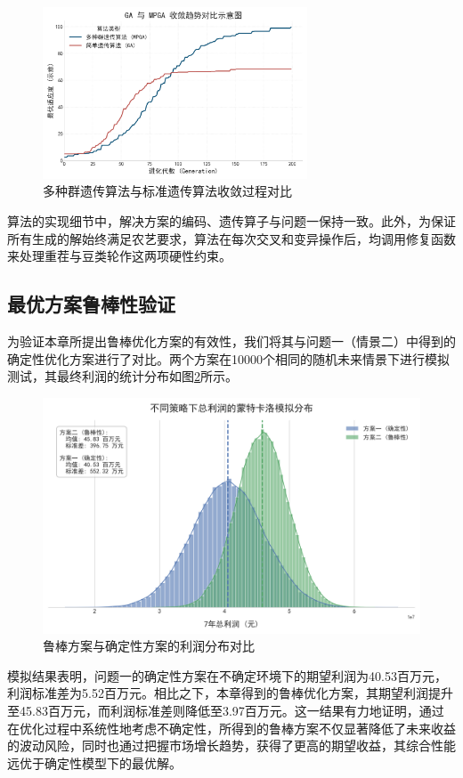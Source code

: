 \begin{figure}[H]
    \centering
    \includegraphics[width=0.7\textwidth]{figs/4问题二/遗传算法收敛对比图.png}

    \caption{多种群遗传算法与标准遗传算法收敛过程对比}
    \label{fig:convergence_comparison}
\end{figure}

算法的实现细节中，解决方案的编码、遗传算子与问题一保持一致。此外，为保证所有生成的解始终满足农艺要求，算法在每次交叉和变异操作后，均调用修复函数来处理重茬与豆类轮作这两项硬性约束。


\subsection{最优方案鲁棒性验证}


为验证本章所提出鲁棒优化方案的有效性，我们将其与问题一（情景二）中得到的确定性优化方案进行了对比。两个方案在10000个相同的随机未来情景下进行模拟测试，其最终利润的统计分布如图\ref{fig:robustness_dist}所示。

\begin{figure}[H]
    \centering
    \includegraphics[width=\textwidth]{figs/4问题二/鲁棒性蒙德卡诺模拟分布图.png}
    \caption{鲁棒方案与确定性方案的利润分布对比}
    \label{fig:robustness_dist}
\end{figure}

模拟结果表明，问题一的确定性方案在不确定环境下的期望利润为40.53百万元，利润标准差为5.52百万元。相比之下，本章得到的鲁棒优化方案，其期望利润提升至45.83百万元，而利润标准差则降低至3.97百万元。这一结果有力地证明，通过在优化过程中系统性地考虑不确定性，所得到的鲁棒方案不仅显著降低了未来收益的波动风险，同时也通过把握市场增长趋势，获得了更高的期望收益，其综合性能远优于确定性模型下的最优解。

